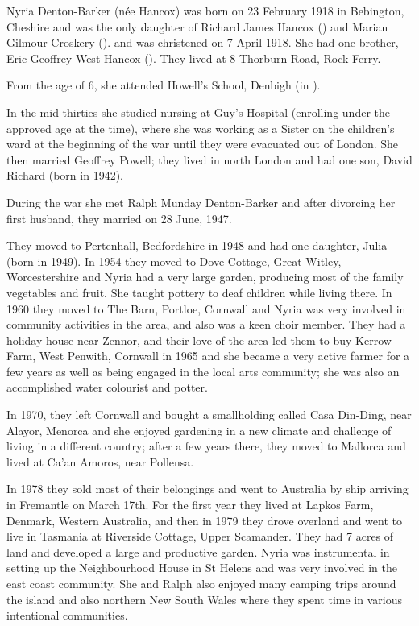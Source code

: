 
Nyria Denton-Barker (n\'{e}e Hancox) was born on 23 February 1918 in Bebington, Cheshire\cite{BMDIndex_JoanNyriaHancox_birth} and was the only daughter of Richard James Hancox ()  and Marian Gilmour Croskery ().\cite{NyriaBirth} and was christened on 7 April 1918.\cite{NyriaChristening} She had one brother, Eric Geoffrey West Hancox ().  They lived at 8 Thorburn Road, Rock Ferry. 

From the age of 6, she attended Howell's School, Denbigh (in ).\cite{OralHistoryJDB2008}

In the mid-thirties she studied nursing at Guy's Hospital (enrolling under the approved age at the time),  where she was working  as a Sister on the children's ward at the beginning of the war until they were evacuated out of London. She then married Geoffrey Powell; they lived in north London and had one son, David Richard (born in 1942).

During the war she met Ralph Munday Denton-Barker and after divorcing her first husband, they married on 28 June, 1947.\cite{MarriageCertRalphDentonBarkerJoanNyriaPowell}

They moved to Pertenhall, Bedfordshire in 1948 and had one daughter, Julia (born in 1949).  In 1954 they moved to Dove Cottage, Great Witley, Worcestershire and Nyria had a very large garden, producing most of the family vegetables and fruit. She taught pottery to deaf children while living there.  In 1960 they moved to The Barn, Portloe, Cornwall and Nyria was very involved in community activities in the area, and also was a keen choir member.  They had a holiday house near Zennor, and their love of the area led them to buy Kerrow Farm, West Penwith, Cornwall in 1965 and she became a very active farmer for a few years as well as being engaged in the local arts community; she was also an accomplished water colourist and potter.

In 1970, they left Cornwall and  bought a smallholding called Casa Din-Ding, near Alayor, Menorca and she enjoyed  gardening in  a new climate and challenge of living in a different country;  after a few years there, they moved to Mallorca and lived at Ca'an Amoros, near Pollensa.  

In 1978 they sold most of their belongings and went to Australia by ship arriving in Fremantle on March 17th.  For the first year they lived at Lapkos Farm, Denmark, Western Australia, and then in 1979 they drove overland and went to live in Tasmania at Riverside Cottage, Upper Scamander. They had 7 acres of land and developed a large and productive garden. Nyria was instrumental in setting up the Neighbourhood House in St Helens and was very involved in the east coast community.  She and Ralph also enjoyed many camping trips around the island and also northern New South Wales where they spent time in various intentional communities. 


